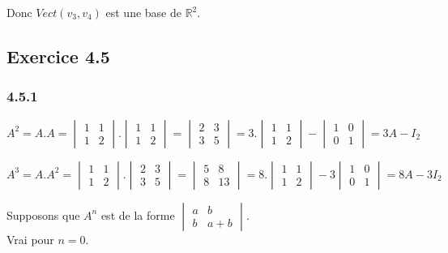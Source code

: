 \documentclass[]{book}
\theoremstyle{definition}
\newcommand{\bb}[1]{\mathbb{#1}}
\newcommand{\R}{\bb{R}}
\begin{document}
Donc $Vect(v_3,v_4)$ est une base de $\R^2$.\\


\subsection*{Exercice 4.5}
\subsubsection*{4.5.1}

$$A^2 = A.A = 
\begin{vmatrix} 1 & 1 \\ 1 & 2 \end{vmatrix} .
\begin{vmatrix} 1 & 1 \\ 1 & 2 \end{vmatrix} = 
\begin{vmatrix} 2 & 3 \\ 3 & 5 \end{vmatrix} = 
3. \begin{vmatrix} 1 & 1 \\ 1 & 2 \end{vmatrix} - 
\begin{vmatrix} 1 & 0 \\ 0 & 1 \end{vmatrix} = 3A - I_2
$$

$$A^3 = A.A^2 = 
\begin{vmatrix} 1 & 1 \\ 1 & 2 \end{vmatrix} .
\begin{vmatrix} 2 & 3 \\ 3 & 5 \end{vmatrix} = 
\begin{vmatrix} 5 & 8 \\ 8 & 13 \end{vmatrix} = 
8. \begin{vmatrix} 1 & 1 \\ 1 & 2 \end{vmatrix} - 
3 \begin{vmatrix} 1 & 0 \\ 0 & 1 \end{vmatrix} = 8A - 3I_2
$$


Supposons que $A^n$ est de la forme $\begin{vmatrix} a & b \\ b & a+b \end{vmatrix}$.\\
Vrai pour $n=0$.\\
\end{document}
